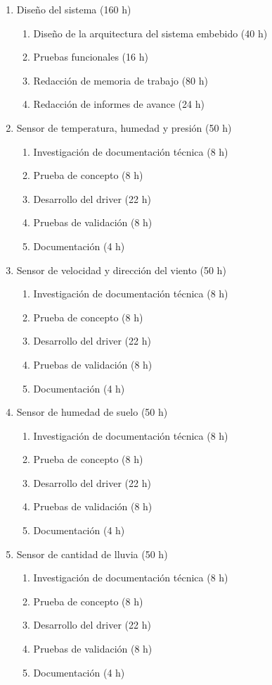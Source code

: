\documentclass[
11pt, %
codirector, %
]{charter}
\begin{document}
\begin{enumerate}

\item Diseño del sistema (160 h)
	\begin{enumerate}
	\item Diseño de la arquitectura del sistema embebido (40 h)
	\item Pruebas funcionales (16 h)
	\item Redacción de memoria de trabajo (80 h)
	\item Redacción de informes de avance (24 h)
	\end{enumerate}

\item Sensor de temperatura, humedad y presión (50 h)
	\begin{enumerate}
	\item Investigación de documentación técnica (8 h)
	\item Prueba de concepto (8 h)
	\item Desarrollo del driver (22 h)
	\item Pruebas de validación (8 h)
	\item Documentación (4 h)
	\end{enumerate}
	
\item Sensor de velocidad y dirección del viento (50 h)
	\begin{enumerate}
	\item Investigación de documentación técnica (8 h)
	\item Prueba de concepto (8 h)
	\item Desarrollo del driver (22 h)
	\item Pruebas de validación (8 h)
	\item Documentación (4 h)
	\end{enumerate}
	
\item Sensor de humedad de suelo (50 h)
	\begin{enumerate}
	\item Investigación de documentación técnica (8 h)
	\item Prueba de concepto (8 h)
	\item Desarrollo del driver (22 h)
	\item Pruebas de validación (8 h)
	\item Documentación (4 h)
	\end{enumerate}
	
\item Sensor de cantidad de lluvia (50 h)
	\begin{enumerate}
	\item Investigación de documentación técnica (8 h)
	\item Prueba de concepto (8 h)
	\item Desarrollo del driver (22 h)
	\item Pruebas de validación (8 h)
	\item Documentación (4 h)
	\end{enumerate}
	

\end{enumerate}
\end{document}
